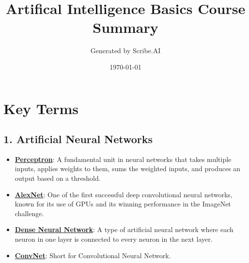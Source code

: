 \documentclass{article}%
\title{Artifical Intelligence Basics Course Summary}%
\author{Generated by Scribe.AI}%
\date{\today}%
\begin{document}
%
\normalsize%
\maketitle%
\section{Key Terms}%
\label{sec:KeyTerms}%
\subsection{1. Artificial Neural Networks}%
\label{subsec:1.ArtificialNeuralNetworks}%
\begin{itemize}[leftmargin=*]%
\item \href{https://purdue.brightspace.com/d2l/common/assets/pdfjs-d2l-dist/1.0.14-legacy/web/viewer.html?file=\%2Fcontent\%2Fenforced\%2F1095467-wl.202510.CS.24300.001\%2F02L2-Intro.pdf\%3Fou\%3D1095467\&lang=en-us\&container=d2l-fileviewer-rendered-pdf\&fullscreen=d2l-fileviewer-rendered-pdf-dialog\&height=667#page=45}{\textbf{Perceptron}}: A fundamental unit in neural networks that takes multiple inputs, applies weights to them, sums the weighted inputs, and produces an output based on a threshold.%
\item \href{https://purdue.brightspace.com/d2l/common/assets/pdfjs-d2l-dist/1.0.14-legacy/web/viewer.html?file=\%2Fcontent\%2Fenforced\%2F1095467-wl.202510.CS.24300.001\%2F09L1-cnn.pdf\%3Fou\%3D1095467\&lang=en-us\&container=d2l-fileviewer-rendered-pdf\&fullscreen=d2l-fileviewer-rendered-pdf-dialog\&height=667#page=3}{\textbf{AlexNet}}: One of the first successful deep convolutional neural networks, known for its use of GPUs and its winning performance in the ImageNet challenge.%
\item \href{https://purdue.brightspace.com/d2l/common/assets/pdfjs-d2l-dist/1.0.14-legacy/web/viewer.html?file=\%2Fcontent\%2Fenforced\%2F1095467-wl.202510.CS.24300.001\%2F09L1-cnn.pdf\%3Fou\%3D1095467\&lang=en-us\&container=d2l-fileviewer-rendered-pdf\&fullscreen=d2l-fileviewer-rendered-pdf-dialog\&height=667#page=4}{\textbf{Dense Neural Network}}: A type of artificial neural network where each neuron in one layer is connected to every neuron in the next layer.%
\item \href{https://purdue.brightspace.com/d2l/common/assets/pdfjs-d2l-dist/1.0.14-legacy/web/viewer.html?file=\%2Fcontent\%2Fenforced\%2F1095467-wl.202510.CS.24300.001\%2F09L1-cnn.pdf\%3Fou\%3D1095467\&lang=en-us\&container=d2l-fileviewer-rendered-pdf\&fullscreen=d2l-fileviewer-rendered-pdf-dialog\&height=667#page=4}{\textbf{ConvNet}}: Short for Convolutional Neural Network.%

\end{itemize}
\end{document}
